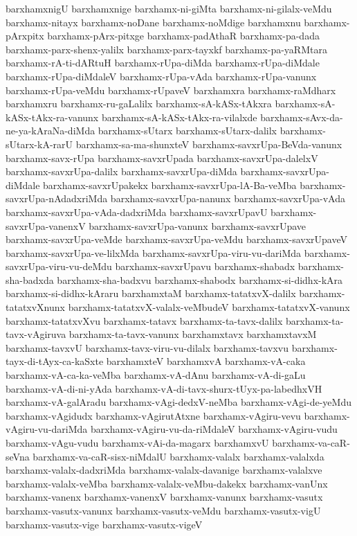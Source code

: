 {barxhamxnigU
barxhamxnige
barxhamx-ni-giMta
barxhamx-ni-gilalx-veMdu
barxhamx-nitayx
barxhamx-noDane
barxhamx-noMdige
barxhamxnu
barxhamx-pArxpitx
barxhamx-pArx-pitxge
barxhamx-padAthaR
barxhamx-pa-dada
barxhamx-parx-shenx-yalilx
barxhamx-parx-tayxkf
barxhamx-pa-yaRMtara
barxhamx-rA-ti-dARtuH
barxhamx-rUpa-diMda
barxhamx-rUpa-diMdale
barxhamx-rUpa-diMdaleV
barxhamx-rUpa-vAda
barxhamx-rUpa-vanunx
barxhamx-rUpa-veMdu
barxhamx-rUpaveV
barxhamxra
barxhamx-raMdharx
barxhamxru
barxhamx-ru-gaLalilx
barxhamx-sA-kASx-tAkxra
barxhamx-sA-kASx-tAkx-ra-vanunx
barxhamx-sA-kASx-tAkx-ra-vilalxde
barxhamx-sAvx-da-ne-ya-kAraNa-diMda
barxhamx-sUtarx
barxhamx-sUtarx-dalilx
barxhamx-sUtarx-kA-rarU
barxhamx-sa-ma-shunxteV
barxhamx-savxrUpa-BeVda-vanunx
barxhamx-savx-rUpa
barxhamx-savxrUpada
barxhamx-savxrUpa-dalelxV
barxhamx-savxrUpa-dalilx
barxhamx-savxrUpa-diMda
barxhamx-savxrUpa-diMdale
barxhamx-savxrUpakekx
barxhamx-savxrUpa-lA-Ba-veMba
barxhamx-savxrUpa-nAdadxriMda
barxhamx-savxrUpa-nanunx
barxhamx-savxrUpa-vAda
barxhamx-savxrUpa-vAda-dadxriMda
barxhamx-savxrUpavU
barxhamx-savxrUpa-vanenxV
barxhamx-savxrUpa-vanunx
barxhamx-savxrUpave
barxhamx-savxrUpa-veMde
barxhamx-savxrUpa-veMdu
barxhamx-savxrUpaveV
barxhamx-savxrUpa-ve-lilxMda
barxhamx-savxrUpa-viru-vu-dariMda
barxhamx-savxrUpa-viru-vu-deMdu
barxhamx-savxrUpavu
barxhamx-shabadx
barxhamx-sha-badxda
barxhamx-sha-badxvu
barxhamx-shabodx
barxhamx-si-didhx-kAra
barxhamx-si-didhx-kAraru
barxhamxtaM
barxhamx-tatatxvX-dalilx
barxhamx-tatatxvXnunx
barxhamx-tatatxvX-valalx-veMbudeV
barxhamx-tatatxvX-vanunx
barxhamx-tatatxvXvu
barxhamx-tatavx
barxhamx-ta-tavx-dalilx
barxhamx-ta-tavx-vAgiruva
barxhamx-ta-tavx-vanunx
barxhamxtavx
barxhamxtavxM
barxhamx-tavxvU
barxhamx-tavx-viru-vu-dilalx
barxhamx-tavxvu
barxhamx-tayx-di-tAyx-ca-kaSxte
barxhamxteV
barxhamxvA
barxhamx-vA-caka
barxhamx-vA-ca-ka-veMba
barxhamx-vA-dAnu
barxhamx-vA-di-gaLu
barxhamx-vA-di-ni-yAda
barxhamx-vA-di-tavx-shurx-tUyx-pa-labedhxVH
barxhamx-vA-galAradu
barxhamx-vAgi-dedxV-neMba
barxhamx-vAgi-de-yeMdu
barxhamx-vAgidudx
barxhamx-vAgirutAtxne
barxhamx-vAgiru-vevu
barxhamx-vAgiru-vu-dariMda
barxhamx-vAgiru-vu-da-riMdaleV
barxhamx-vAgiru-vudu
barxhamx-vAgu-vudu
barxhamx-vAi-da-magarx
barxhamxvU
barxhamx-va-caR-seVna
barxhamx-va-caR-sisx-niMdalU
barxhamx-valalx
barxhamx-valalxda
barxhamx-valalx-dadxriMda
barxhamx-valalx-davanige
barxhamx-valalxve
barxhamx-valalx-veMba
barxhamx-valalx-veMbu-dakekx
barxhamx-vanUnx
barxhamx-vanenx
barxhamx-vanenxV
barxhamx-vanunx
barxhamx-vasutx
barxhamx-vasutx-vanunx
barxhamx-vasutx-veMdu
barxhamx-vasutx-vigU
barxhamx-vasutx-vige
barxhamx-vasutx-vigeV
}
